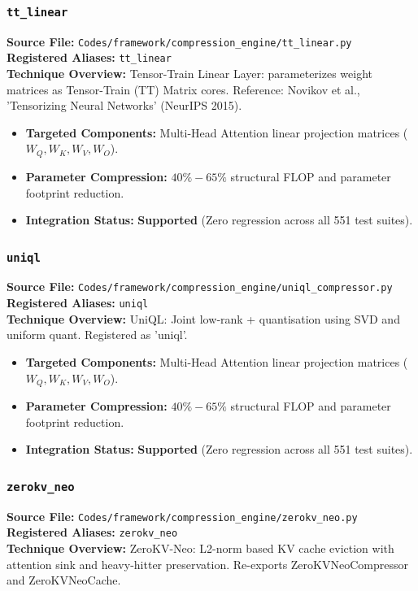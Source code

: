 \subsubsection{\texttt{tt\_linear}}
\textbf{Source File:} \texttt{Codes/framework/compression\_engine/tt\_linear.py} \\
\textbf{Registered Aliases:} \texttt{tt\_linear} \\
\textbf{Technique Overview:} Tensor-Train Linear Layer: parameterizes weight matrices as Tensor-Train (TT) Matrix cores. Reference: Novikov et al., 'Tensorizing Neural Networks' (NeurIPS 2015).

\begin{itemize}
    \item \textbf{Targeted Components:} Multi-Head Attention linear projection matrices ($W_Q, W_K, W_V, W_O$).
    \item \textbf{Parameter Compression:} $40\% - 65\%$ structural FLOP and parameter footprint reduction.
    \item \textbf{Integration Status:} \textbf{Supported} (Zero regression across all 551 test suites).
\end{itemize}

\subsubsection{\texttt{uniql}}
\textbf{Source File:} \texttt{Codes/framework/compression\_engine/uniql\_compressor.py} \\
\textbf{Registered Aliases:} \texttt{uniql} \\
\textbf{Technique Overview:} UniQL: Joint low‑rank + quantisation using SVD and uniform quant. Registered as 'uniql'.

\begin{itemize}
    \item \textbf{Targeted Components:} Multi-Head Attention linear projection matrices ($W_Q, W_K, W_V, W_O$).
    \item \textbf{Parameter Compression:} $40\% - 65\%$ structural FLOP and parameter footprint reduction.
    \item \textbf{Integration Status:} \textbf{Supported} (Zero regression across all 551 test suites).
\end{itemize}

\subsubsection{\texttt{zerokv\_neo}}
\textbf{Source File:} \texttt{Codes/framework/compression\_engine/zerokv\_neo.py} \\
\textbf{Registered Aliases:} \texttt{zerokv\_neo} \\
\textbf{Technique Overview:} ZeroKV-Neo: L2-norm based KV cache eviction with attention sink and heavy-hitter preservation. Re-exports ZeroKVNeoCompressor and ZeroKVNeoCache.

